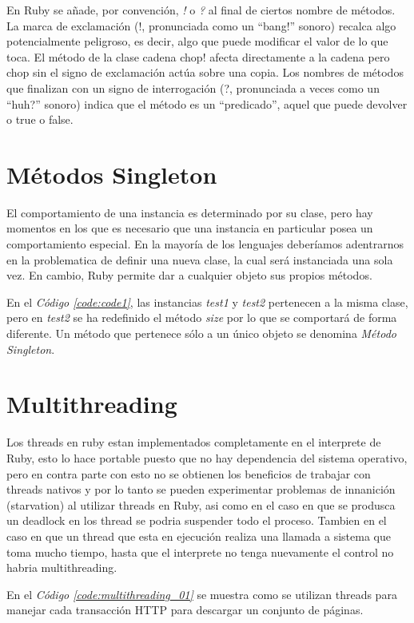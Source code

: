 \documentclass{article}
\newcommand{\refcode}[1]{\textit{Código \ref{#1}}}
\begin{document}
En Ruby se añade, por convención, \textit{!} o \textit{?} al final de ciertos nombre de métodos.  La marca de exclamación (!, pronunciada como un “bang!” sonoro)  recalca algo potencialmente peligroso, es decir, algo que puede modificar el valor de lo que toca. El método de la clase cadena chop! afecta directamente a la cadena pero chop sin el signo de exclamación actúa sobre una copia.
Los nombres de métodos que finalizan con un signo de interrogación (?, pronunciada a veces como un “huh?” sonoro) indica que el método es un “predicado”, aquel que puede devolver o true o false.




\section{Métodos Singleton}

	El comportamiento de una instancia es determinado por su clase, pero hay momentos en los que es necesario que una instancia en particular posea un comportamiento especial. En la mayoría de los lenguajes deberíamos adentrarnos en la problematica de definir una nueva clase, la cual será instanciada una sola vez. En cambio, Ruby permite dar a cualquier objeto sus propios métodos.

 
\bigskip

	En el \refcode{code:code1}, las instancias \textit{test1} y \textit{test2} pertenecen a la misma clase, pero en \textit{test2} se ha redefinido el método \textit{size} por lo que se comportará de forma diferente. Un método que pertenece sólo a un único objeto se denomina \textit{Método Singleton}.




\section{Multithreading}

	Los threads en ruby estan implementados completamente en el interprete de Ruby, esto lo hace portable puesto que no hay dependencia del sistema operativo, pero en contra parte con esto no se obtienen los beneficios de trabajar con threads nativos y por lo tanto se pueden experimentar problemas de innanición (starvation) al utilizar threads en Ruby, asi como en el caso en que se produsca un deadlock en los thread se podria suspender todo el proceso. Tambien en el caso en que un thread que esta en ejecución realiza una llamada a sistema que toma mucho tiempo, hasta que el interprete no tenga nuevamente el control no habria multithreading.
	\par
	En el \refcode{code:multithreading_01} se muestra como se utilizan threads para manejar cada transacción HTTP para descargar un conjunto de páginas.
\end{document}
